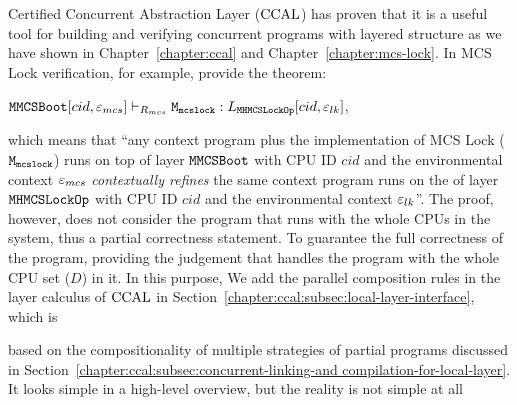 Certified Concurrent Abstraction Layer  ($\ccalname$)
has proven that it is a useful tool 
for building and verifying concurrent programs with layered structure 
as we have shown in Chapter~\ref{chapter:ccal} and Chapter~\ref{chapter:mcs-lock}.
In MCS Lock verification, for example, provide 
the theorem:
\begin{center}
$\ltyp{\PLayer{\mmcsbootfull}{cid}{\oracle_{mcs}}}{R_{mcs}}{\codeinmath{M}_{\codeinmath{mcslock}}}{\PLayer{L_{\mhmcslockopfull}}{cid}{\oracle_{lk}}}$,
\end{center}
which means that ``any context program plus the implementation of MCS Lock ($\codeinmath{M}_{\codeinmath{mcslock}}$) runs on top of 
  layer $\mmcsbootfull$ with CPU ID $cid$ and the environmental context $\oracle_{mcs}$ \textit{contextually refines}
 the same context program runs on the of  layer $\mhmcslockopfull$ with CPU ID $cid$ and the environmental context $\oracle_{lk}$''. 
The proof, however, does not 
consider the program that runs with 
the whole CPUs in the system, thus a partial correctness statement. 
To guarantee the full correctness of the program,
providing the judgement that handles 
the program with the whole CPU set ($D$) in it. 
In this purpose, 
We add the parallel composition rules in the layer calculus of $\ccalname$ in Section~\ref{chapter:ccal:subsec:local-layer-interface}, which is 
\begin{mathpar}
\end{mathpar}
based on the compositionality of multiple strategies 
of partial programs discussed in Section~\ref{chapter:ccal:subsec:concurrent-linking-and compilation-for-local-layer}.   
It looks simple in a high-level overview, but the reality is not simple at all
